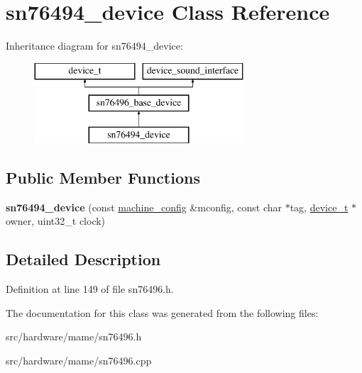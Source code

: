 \hypertarget{classsn76494__device}{\section{sn76494\-\_\-device Class Reference}
\label{classsn76494__device}
}
Inheritance diagram for sn76494\-\_\-device\-:\begin{figure}[H]
\begin{center}
\leavevmode
\includegraphics[height=3.000000cm]{classsn76494__device}
\end{center}
\end{figure}
\subsection*{Public Member Functions}
\begin{DoxyCompactItemize}
\item 
\hypertarget{classsn76494__device_a49c5faf1092ead28db777cf845ae60f7}{{\bfseries sn76494\-\_\-device} (const \hyperlink{structmachine__config}{machine\-\_\-config} \&mconfig, const char $\ast$tag, \hyperlink{classdevice__t}{device\-\_\-t} $\ast$owner, uint32\-\_\-t clock)}\label{classsn76494__device_a49c5faf1092ead28db777cf845ae60f7}

\end{DoxyCompactItemize}


\subsection{Detailed Description}


Definition at line 149 of file sn76496.\-h.



The documentation for this class was generated from the following files\-:\begin{DoxyCompactItemize}
\item 
src/hardware/mame/sn76496.\-h\item 
src/hardware/mame/sn76496.\-cpp\end{DoxyCompactItemize}
